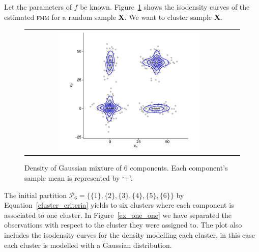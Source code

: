 \documentclass[submit]{smj}
\theoremstyle{definition}
\newcommand{\fmm}{\textsc{fmm}\xspace}
\begin{document}
Let the parameters of $f$ be known. Figure~\ref{ex_mixture} shows the isodensity curves of the estimated \fmm for 
a random sample \textbf{X}. We want to cluster sample \textbf{X}.

\begin{figure}[htbp]
\begin{center}
\begin{tabular}{cc}
  \includegraphics[width=0.7\textwidth]{figures/partition-example-mixture.pdf} \\
 \end{tabular}
 \caption{Density of Gaussian mixture of 6 components. Each component's sample mean is represented by `+'.}\label{ex_mixture}
\end{center}
\end{figure}

The initial partition  $\mathcal{P}_6 = \{ \{1\},\{2\}, \{3\}, \{4\}, \{5\}, \{6\} \}$  by Equation~\ref{cluster_criteria} yields to six clusters where each component is associated to one cluster. In Figure~\ref{ex_one_one} we have separated the observations with respect to the cluster they were assigned to. The plot also includes the isodensity curves for the density modelling each cluster, in this case each cluster is modelled with a Gaussian distribution.
\end{document}
